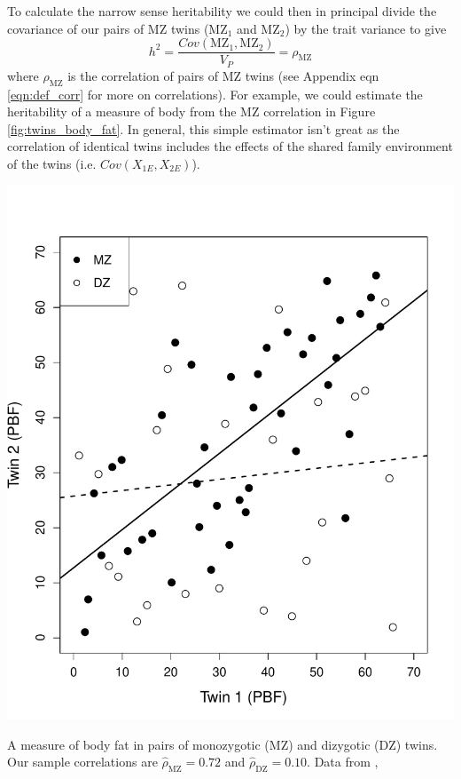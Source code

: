 To calculate the narrow sense heritability we could then in principal divide the
covariance of our pairs of MZ  twins (MZ$_1$ and MZ$_2$) by the trait variance to give
\begin{equation}
h^2 = \frac{Cov(\text{MZ}_1, \text{MZ}_2) }{V_P} =
\rho_{\text{MZ}}
\end{equation}
where $\rho_{\text{MZ}}$ is the correlation of pairs of MZ twins (see
Appendix eqn \eqref{eqn:def_corr} for more on correlations).
For example, we could estimate the heritability of a measure of body
from the MZ correlation in Figure \ref{fig:twins_body_fat}. In general, this simple estimator isn't great as the correlation of
identical twins includes the effects of the shared family
environment of the twins (i.e. $Cov(X_{1E},X_{2E})$).
 \begin{marginfigure}
 \begin{center}
 \includegraphics[width=\textwidth]{Journal_figs/Quant_gen/twins_body_fat/twins_body_fat.pdf}
 \end{center}
 \caption{A measure of body fat in pairs of monozygotic (MZ) and
   dizygotic (DZ) twins. Our sample  correlations are
   $\hat{\rho}_{\text{MZ}}=0.72$ and $\hat{\rho}_{\text{DZ}}=0.10$. Data from \citet{faith1999evidence}, }\label{fig:twins_body_fat}
 \end{marginfigure}
